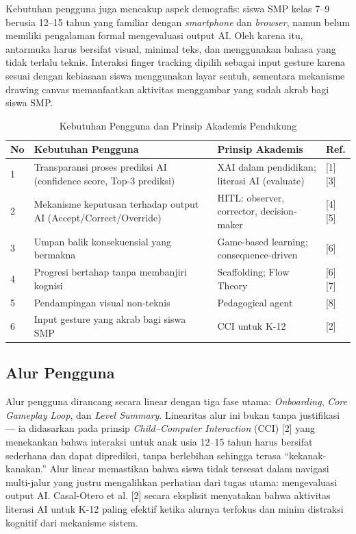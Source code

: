 Kebutuhan pengguna juga mencakup aspek demografis: siswa SMP kelas 7--9 berusia 12--15 tahun yang familiar dengan \textit{smartphone} dan \textit{browser}, namun belum memiliki pengalaman formal mengevaluasi output AI. Oleh karena itu, antarmuka harus bersifat visual, minimal teks, dan menggunakan bahasa yang tidak terlalu teknis. Interaksi finger tracking dipilih sebagai input gesture karena sesuai dengan kebiasaan siswa menggunakan layar sentuh, sementara mekanisme drawing canvas memanfaatkan aktivitas menggambar yang sudah akrab bagi siswa SMP.

\begin{table}[H]
\centering
\caption{Kebutuhan Pengguna dan Prinsip Akademis Pendukung}
\label{tab:kebutuhan-pengguna}
\begin{tabular}{|p{0.5cm}|p{5cm}|p{4cm}|p{2.5cm}|}
\hline
\textbf{No} & \textbf{Kebutuhan Pengguna} & \textbf{Prinsip Akademis} & \textbf{Ref.} \\ \hline
1 & Transparansi proses prediksi AI (confidence score, Top-3 prediksi) & XAI dalam pendidikan; literasi AI (evaluate) & [1][3] \\ \hline
2 & Mekanisme keputusan terhadap output AI (Accept/Correct/Override) & HITL: observer, corrector, decision-maker & [4][5] \\ \hline
3 & Umpan balik konsekuensial yang bermakna & Game-based learning; consequence-driven & [6] \\ \hline
4 & Progresi bertahap tanpa membanjiri kognisi & Scaffolding; Flow Theory & [6][7] \\ \hline
5 & Pendampingan visual non-teknis & Pedagogical agent & [8] \\ \hline
6 & Input gesture yang akrab bagi siswa SMP & CCI untuk K-12 & [2] \\ \hline
\end{tabular}
\end{table}


\subsection{Alur Pengguna}
\label{subsec:alur-pengguna}

Alur pengguna dirancang secara linear dengan tiga fase utama: \textit{Onboarding}, \textit{Core Gameplay Loop}, dan \textit{Level Summary}. Linearitas alur ini bukan tanpa justifikasi --- ia didasarkan pada prinsip \textit{Child--Computer Interaction} (CCI) [2] yang menekankan bahwa interaksi untuk anak usia 12--15 tahun harus bersifat sederhana dan dapat diprediksi, tanpa berlebihan sehingga terasa ``kekanak-kanakan.'' Alur linear memastikan bahwa siswa tidak tersesat dalam navigasi multi-jalur yang justru mengalihkan perhatian dari tugas utama: mengevaluasi output AI. Casal-Otero et al. [2] secara eksplisit menyatakan bahwa aktivitas literasi AI untuk K-12 paling efektif ketika alurnya terfokus dan minim distraksi kognitif dari mekanisme sistem.

